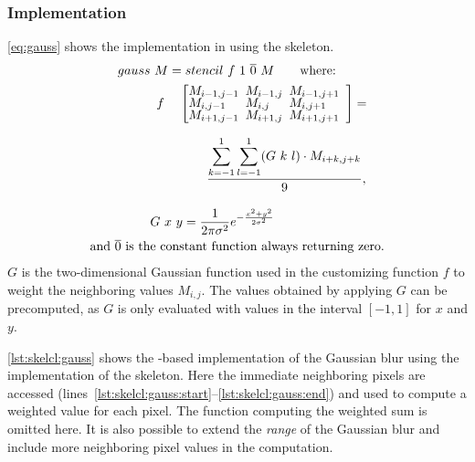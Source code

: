 \subsubsection*{\SkelCL Implementation}
\autoref{eq:gauss} shows the implementation in \SkelCL using the \stencil skeleton.
\begin{align}
  gauss&\ M = stencil\ f\ 1\ \overline{0}\ M \qquad\text{where:}\nonumber\\
  &
  \begin{array}{ll}%
  f\ &\left[\begin{array}{lll}%
      \hspace{-.5em} M_{i-1,j-1}& \hspace{-.5em} M_{i-1,j} & \hspace{-.5em}M_{i-1,j+1}\vspace{-.25em}\\%
      \hspace{-.5em} M_{i,j-1}& \hspace{-.5em} M_{i,j} & \hspace{-.5em}M_{i,j+1}\vspace{-.25em}\\%
      \hspace{-.5em} M_{i+1,j-1}& \hspace{-.5em} M_{i+1,j} & \hspace{-.5em}M_{i+1,j+1}
    \end{array}\right]  = \\[2em]
          &\qquad \displaystyle\frac{\displaystyle\sum_{k=-1}^{1} \sum_{l=-1}^{1} (G\ k\ l)\cdot M_{i+k, j+k}}{9},
  \end{array} \label{eq:gauss}\\[1em]
  &G\ x\ y = \frac{1}{2\pi \sigma^{2}} e^{-\frac{x^2 + y^2}{2\sigma^2}} \nonumber\\
  \text{and } \overline{0} \text{ is th}&\text{e constant function always returning zero.}\nonumber
\end{align}
$G$ is the two-dimensional Gaussian function used in the customizing function $f$ to weight the neighboring values $M_{i,j}$.
The values obtained by applying $G$ can be precomputed, as $G$ is only evaluated with values in the interval $[-1, 1]$ for $x$ and $y$.


\autoref{lst:skelcl:gauss} shows the \SkelCL-based implementation of the Gaussian blur using the  implementation of the \stencil skeleton.
Here the immediate neighboring pixels are accessed (lines~\ref{lst:skelcl:gauss:start}--\ref{lst:skelcl:gauss:end}) and used to compute a weighted value for each pixel.
The function computing the weighted sum is omitted here.
It is also possible to extend the \emph{range} of the Gaussian blur and include more neighboring pixel values in the computation.

